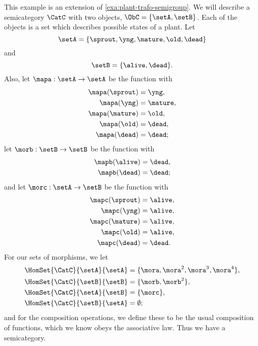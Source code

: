 \begin{example}
    \label{exa:semicat-plant-states}
    This example is an extension of \cref{exa:plant-trafo-semigroup}.
    We will describe a semicategory $\CatC$ with two objects, $\ObC = \{ \setA, \setB \}$.
    Each of the objects is a set which describes possible states of a plant.
    Let
    \begin{equation}
        \setA = \{ \sprout, \yng, \mature, \old, \dead \}
    \end{equation}
    and
    \begin{equation}
        \setB = \{ \alive, \dead \}.
    \end{equation}
    Also, let $\mapa : \setA \to \setA$ be the function with
    \begin{align*}
        \mapa(\sprout) & =  \yng, \\
        \mapa(\yng)    & =  \mature, \\
        \mapa(\mature) & =  \old, \\
        \mapa( \old)   & = \dead, \\
        \mapa(\dead)   & = \dead;
    \end{align*}
    let $\morb : \setB \to \setB$ be the function with
    \begin{align*}
        \mapb(\alive) & =  \dead, \\
        \mapb(\dead)  & =  \dead;
    \end{align*}
    and let $\morc : \setA \to \setB$ be the function with
    \begin{align*}
        \mapc(\sprout) & = \alive, \\
        \mapc(\yng)    & =  \alive, \\
        \mapc(\mature) & = \alive , \\
        \mapc( \old)   & = \alive, \\
        \mapc (\dead)  & = \dead.
    \end{align*}
    For our sets of morphisms, we let
    \begin{align*}
        \HomSet{\CatC}{\setA}{\setA} & = \{ \mora, \mora^2, \mora^3, \mora^4 \}, \\
        \HomSet{\CatC}{\setB}{\setB} & =  \{ \morb, \morb^2 \}, \\
        \HomSet{\CatC}{\setA}{\setB} & =  \{ \morc \}, \\
        \HomSet{\CatC}{\setB}{\setA} & = \emptyset;
    \end{align*}
    and for the composition operations, we define these to be the usual composition of functions, which we know obeys the associative law.
    Thus we have a semicategory.
\end{example}

